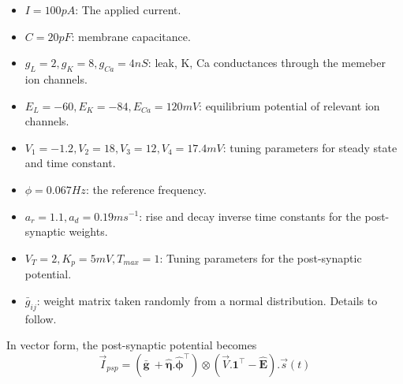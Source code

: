 \documentclass[12pt, letter]{article}
\begin{document}
	\begin{itemize}
		\item $I = 100 pA$: The applied current.
		\item $C = 20 pF$: membrane capacitance.
		\item $g_L = 2, g_K = 8, g_{Ca} = 4 nS$: leak, K, Ca conductances through the memeber ion channels.
		\item $E_L = -60, E_K = -84, E_{Ca} = 120 mV$: equilibrium potential of relevant ion channels.
		\item $V_1=-1.2, V_2 = 18, V_3 = 12, V_4 = 17.4 mV$: tuning parameters for steady state and time constant.
		\item $\phi = 0.067 Hz$: the reference frequency.
		\item $a_r = 1.1, a_d = 0.19 ms^{-1}$: rise and decay inverse time constants for the post-synaptic weights.
		\item $V_T = 2, K_p = 5 mV, T_{max} = 1$: Tuning parameters for the post-synaptic potential.
		\item $\bar{g}_{ij}$: weight matrix taken randomly from a normal distribution. Details to follow.
	\end{itemize}
	
	In vector form, the post-synaptic potential becomes
	\begin{equation}
		\vec{I}_{psp} = \left(\mathbf{\bar{g}}\ + \mathbf{\hat{\eta}}.\mathbf{\hat{\phi}}^\intercal\right) \otimes (\vec{V}.\mathbf{1}^\intercal - \mathbf{\hat{E}}).\vec{s}(t)
	\end{equation}
	
\end{document}
